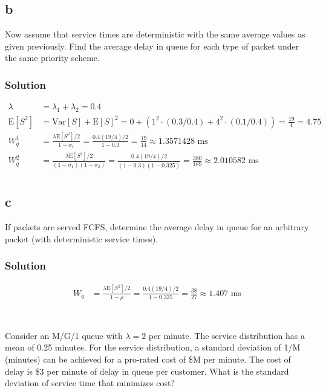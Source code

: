 \documentclass[letterpaper]{amsart}
\begin{document}
\subsection*{b}
Now assume that service times are deterministic with the same average
values as given previously. Find the average delay in queue for each type
of packet under the same priority scheme.
\subsubsection*{Solution}
\begin{align*}
  \lambda &= \lambda_1+\lambda_2=0.4 \\
  \text{E}[S^2]&=\text{Var}[S]+\text{E}[S]^2 = 0 + (1^2\cdot (0.3/0.4)+4^2\cdot (0.1/0.4))
  = \frac{19}{4} = 4.75\\
  W_q^{1}&=\frac{\lambda\text{E}[S^2]/2}{1-\sigma_1}
           = \frac{0.4(19/4)/2}{1-0.3}=\frac{19}{14}\approx 1.3571428\text{ ms}\\
  W_q^{2}&=\frac{\lambda\text{E}[S^2]/2}{(1-\sigma_1)(1-\sigma_2)}
  = \frac{0.4(19/4)/2}{(1-0.3)(1-0.325)}=\frac{380}{189}\approx 2.010582\text{ ms}\\
\end{align*}

\subsection*{c}
If packets are served FCFS, determine the average delay in queue for an
arbitrary packet (with deterministic service times).
\subsubsection*{Solution}
\begin{align*}
  W_q&=\frac{\lambda\text{E}[S^2]/2}{1-\rho}
           = \frac{0.4(19/4)/2}{1-0.325}=\frac{38}{27}\approx 1.407\text{ ms}\\
\end{align*}

\section{} %
Consider an M/G/1 queue with $\lambda = 2$ per minute. The service distribution has a
mean of 0.25 minutes. For the service distribution, a standard deviation of 1/M
(minutes) can be achieved for a pro-rated cost of \$M per minute. The cost of
delay is \$3 per minute of delay in queue per customer. What is the standard
deviation of service time that minimizes cost?
\end{document}
